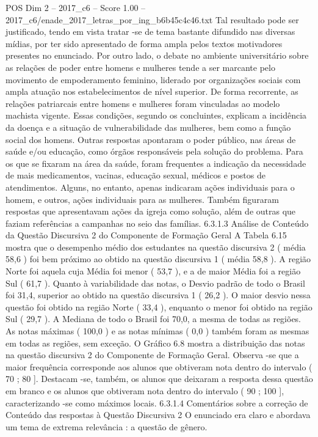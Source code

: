 \begin{textsample}{POS Dim 2 – 2017\_c6 – Score 1.00 – 2017\_c6/enade\_2017\_letras\_por\_ing\_b6b45c4c46.txt}
Tal resultado pode ser justificado, tendo em vista tratar -se de tema bastante difundido nas diversas mídias, por ter sido apresentado de forma ampla pelos textos motivadores presentes no enunciado.
Por outro lado, o debate no ambiente universitário sobre as relações de poder entre homens e mulheres tende a ser marcante pelo movimento de empoderamento feminino, liderado por organizações sociais com ampla atuação nos estabelecimentos de nível superior.
De forma recorrente, as relações patriarcais entre homens e mulheres foram vinculadas ao modelo machista vigente.
Essas condições, segundo os concluintes, explicam a incidência da doença e a situação de vulnerabilidade das mulheres, bem como a função social dos homens.
Outras respostas apontaram o poder público, nas áreas de saúde e/ou educação, como órgãos responsáveis pela solução do problema.
Para os que se fixaram na área da saúde, foram frequentes a indicação da necessidade de mais medicamentos, vacinas, educação sexual, médicos e postos de atendimentos.
Alguns, no entanto, apenas indicaram ações individuais para o homem, e outros, ações individuais para as mulheres.
Também figuraram respostas que apresentavam ações da igreja como solução, além de outras que faziam referências a campanhas no seio das famílias. 6.3.1.3 Análise de Conteúdo da Questão Discursiva 2 do Componente de Formação Geral A Tabela 6.15 mostra que o desempenho médio dos estudantes na questão discursiva 2 ( média 58,6 ) foi bem próximo ao obtido na questão discursiva 1 ( média 58,8 ).
A região Norte foi aquela cuja Média foi menor ( 53,7 ), e a de maior Média foi a região Sul ( 61,7 ).
Quanto à variabilidade das notas, o Desvio padrão de todo o Brasil foi 31,4, superior ao obtido na questão discursiva 1 ( 26,2 ).
O maior desvio nessa questão foi obtido na região Norte ( 33,4 ), enquanto o menor foi obtido na região Sul ( 29,7 ).
A Mediana de todo o Brasil foi 70,0, a mesma de todas as regiões.
As notas máximas ( 100,0 ) e as notas mínimas ( 0,0 ) também foram as mesmas em todas as regiões, sem exceção.
O Gráfico 6.8 mostra a distribuição das notas na questão discursiva 2 do Componente de Formação Geral.
Observa -se que a maior frequência corresponde aos alunos que obtiveram nota dentro do intervalo ( 70 ; 80 ].
Destacam -se, também, os alunos que deixaram a resposta dessa questão em branco e os alunos que obtiveram nota dentro do intervalo ( 90 ; 100 ], caracterizando -se como máximos locais. 6.3.1.4 Comentários sobre a correção de Conteúdo das respostas à Questão Discursiva 2 O enunciado era claro e abordava um tema de extrema relevância : a questão de gênero.

\end{textsample}
